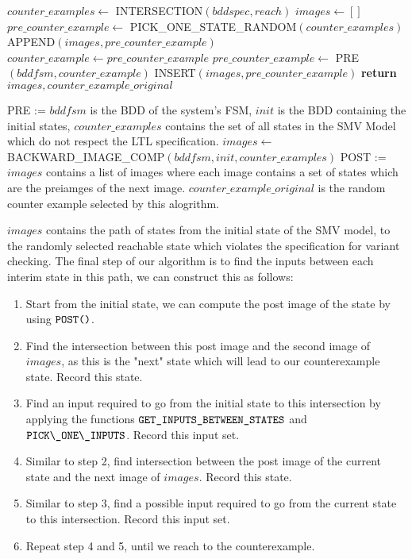 \documentclass{article}
\begin{document}
\begin{algorithmic}[1]
\State $counter\_examples \leftarrow$ INTERSECTION$(bddspec, reach)$
    \State $images \leftarrow []$
    \State $pre\_counter\_example \leftarrow$ PICK\_ONE\_STATE\_RANDOM$(counter\_examples)$
    \State APPEND$(images, pre\_counter\_example)$
        \State $counter\_example \leftarrow pre\_counter\_example$
        \State $pre\_counter\_example \leftarrow$ PRE$(bddfsm, counter\_example)$
        \State INSERT$(images, pre\_counter\_example)$
    \EndWhile
    \State \textbf{return }$images, counter\_example\_original$
\EndFunction
\item[]
\State PRE := $bddfsm$ is the BDD of the system's FSM, $init$ is the BDD containing the initial states, $counter\_examples$ contains the set of all states in the SMV Model which do not respect the LTL specification.
\State $images\leftarrow$ BACKWARD\_IMAGE\_COMP$(bddfsm, init, counter\_examples)$
\State POST := $images$ contains a list of images where each image contains a set of states which are the preiamges of the next image. $counter\_example\_original$ is the random counter example selected by this alogrithm.
\end{algorithmic}

\medskip

$images$ contains the path of states from the initial state of the SMV model, to the randomly selected reachable state which violates the specification for variant checking. The final step of our algorithm is to find the inputs between each interim state in this path, we can construct this as follows:

\begin{enumerate}
    \item Start from the initial state, we can compute the post image of the state by using $\verb|POST()|$.
    \item Find the intersection between this post image and the second image of $images$, as this is the "next" state which will lead to our counterexample state. Record this state.
    \item Find an input required to go from the initial state to this intersection by applying the functions $\verb|GET_INPUTS_BETWEEN_STATES|$ and $\verb|PICK\_ONE\_INPUTS|$. Record this input set.
    \item Similar to step 2, find intersection between the post image of the current state and the next image of $images$. Record this state.
    \item Similar to step 3, find a possible input required to go from the current state to this intersection. Record this input set.
    \item Repeat step 4 and 5, until we reach to the counterexample.
\end{enumerate}
\end{document}
